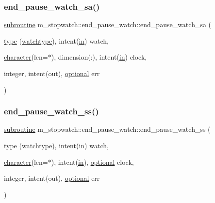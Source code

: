 \subsubsection{\texorpdfstring{end\+\_\+pause\+\_\+watch\+\_\+sa()}{end\_pause\_watch\_sa()}}
{\footnotesize\ttfamily \hyperlink{M__stopwatch_83_8txt_acfbcff50169d691ff02d4a123ed70482}{subroutine} m\+\_\+stopwatch\+::end\+\_\+pause\+\_\+watch\+::end\+\_\+pause\+\_\+watch\+\_\+sa (\begin{DoxyParamCaption}\item[{\hyperlink{stop__watch_83_8txt_a70f0ead91c32e25323c03265aa302c1c}{type} (\hyperlink{structm__stopwatch_1_1watchtype}{watchtype}), intent(\hyperlink{M__journal_83_8txt_afce72651d1eed785a2132bee863b2f38}{in})}]{watch,  }\item[{\hyperlink{option__stopwatch_83_8txt_abd4b21fbbd175834027b5224bfe97e66}{character}(len=$\ast$), dimension(\+:), intent(\hyperlink{M__journal_83_8txt_afce72651d1eed785a2132bee863b2f38}{in})}]{clock,  }\item[{integer, intent(out), \hyperlink{option__stopwatch_83_8txt_aa4ece75e7acf58a4843f70fe18c3ade5}{optional}}]{err }\end{DoxyParamCaption})\hspace{0.3cm}{\ttfamily [private]}}

\mbox{\label{interfacem__stopwatch_1_1end__pause__watch_a3556044c409354912380b0a680fb90fb}} 
\subsubsection{\texorpdfstring{end\+\_\+pause\+\_\+watch\+\_\+ss()}{end\_pause\_watch\_ss()}}
{\footnotesize\ttfamily \hyperlink{M__stopwatch_83_8txt_acfbcff50169d691ff02d4a123ed70482}{subroutine} m\+\_\+stopwatch\+::end\+\_\+pause\+\_\+watch\+::end\+\_\+pause\+\_\+watch\+\_\+ss (\begin{DoxyParamCaption}\item[{\hyperlink{stop__watch_83_8txt_a70f0ead91c32e25323c03265aa302c1c}{type} (\hyperlink{structm__stopwatch_1_1watchtype}{watchtype}), intent(\hyperlink{M__journal_83_8txt_afce72651d1eed785a2132bee863b2f38}{in})}]{watch,  }\item[{\hyperlink{option__stopwatch_83_8txt_abd4b21fbbd175834027b5224bfe97e66}{character}(len=$\ast$), intent(\hyperlink{M__journal_83_8txt_afce72651d1eed785a2132bee863b2f38}{in}), \hyperlink{option__stopwatch_83_8txt_aa4ece75e7acf58a4843f70fe18c3ade5}{optional}}]{clock,  }\item[{integer, intent(out), \hyperlink{option__stopwatch_83_8txt_aa4ece75e7acf58a4843f70fe18c3ade5}{optional}}]{err }\end{DoxyParamCaption})\hspace{0.3cm}{\ttfamily [private]}}



